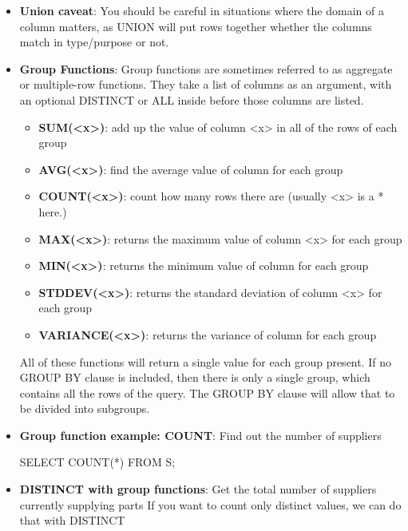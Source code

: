 \documentclass{report}
\begin{document}
\begin{itemize}
\begin{sqlcode}
            \end{sqlcode}
        \item \textbf{Union caveat}: You should be careful in situations where the domain of a column matters, as UNION will put rows together whether the columns match in type/purpose or not.
        \item \textbf{Group Functions}: Group functions are sometimes referred to as aggregate or multiple-row functions. They take a list of columns as an argument, with an optional DISTINCT or ALL inside before those columns are listed.
            \begin{itemize}
                \item \textbf{SUM(<x>)}: add up the value of column <x> in all of the rows of each group
                \item \textbf{AVG(<x>)}: find the average value of column for each group
                \item \textbf{COUNT(<x>)}: count how many rows there are (usually <x> is a * here.)
                \item \textbf{MAX(<x>)}: returns the maximum value of column <x> for each group
                \item \textbf{MIN(<x>)}: returns the minimum value of column for each group
                \item \textbf{STDDEV(<x>)}: returns the standard deviation of column <x> for each group
                \item \textbf{VARIANCE(<x>)}: returns the variance of column for each group
            \end{itemize}
            All of these functions will return a single value for each group present.
            \bigbreak \noindent 
            If no GROUP BY clause is included, then there is only a single group, which contains all the rows of the query. The GROUP BY clause will allow that to be divided into subgroups.
        \item \textbf{Group function example: COUNT}: Find out the number of suppliers
            \bigbreak \noindent 
            \begin{sqlcode}
                SELECT COUNT(*) FROM S;
            \end{sqlcode}
        \item \textbf{DISTINCT with group functions}: Get the total number of suppliers currently supplying parts
            \bigbreak \noindent 
            If you want to count only distinct values, we can do that with DISTINCT
            \bigbreak \noindent 

\end{itemize}
\end{document}
